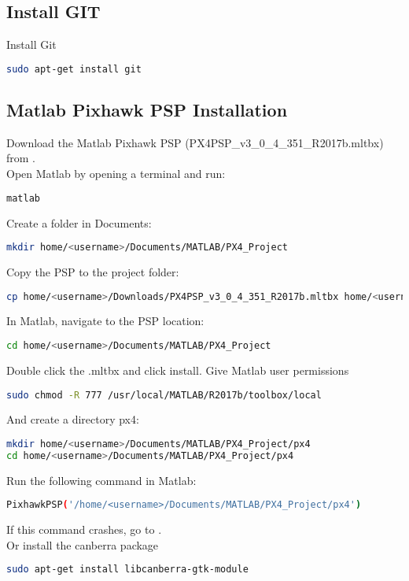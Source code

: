 \subsection{Install GIT}
Install Git
\begin{lstlisting}[language=sh]
sudo apt-get install git
\end{lstlisting}
\subsection{Matlab Pixhawk PSP Installation}
Download the Matlab Pixhawk PSP (PX4PSP\_v3\_0\_4\_351\_R2017b.mltbx) from \cite{Matlab_PSP}.\\
Open Matlab by opening a terminal and run:
\begin{lstlisting}[language=sh]
matlab
\end{lstlisting}
Create a folder in Documents:
\begin{lstlisting}[language=sh]
mkdir home/<username>/Documents/MATLAB/PX4_Project
\end{lstlisting}
Copy the PSP to the project folder:
\begin{lstlisting}[language=sh]
cp home/<username>/Downloads/PX4PSP_v3_0_4_351_R2017b.mltbx home/<username>/Documents/MATLAB/PX4_Project
\end{lstlisting}
In Matlab, navigate to the PSP location:
\begin{lstlisting}[language=sh]
cd home/<username>/Documents/MATLAB/PX4_Project
\end{lstlisting}
Double click the .mltbx and click install.
Give Matlab user permissions
\begin{lstlisting}[language=sh]
sudo chmod -R 777 /usr/local/MATLAB/R2017b/toolbox/local
\end{lstlisting}
And create a directory px4:
\begin{lstlisting}[language=sh]
mkdir home/<username>/Documents/MATLAB/PX4_Project/px4
cd home/<username>/Documents/MATLAB/PX4_Project/px4
\end{lstlisting}
Run the following command in Matlab:
\begin{lstlisting}[language=sh]
PixhawkPSP('/home/<username>/Documents/MATLAB/PX4_Project/px4')
\end{lstlisting}
If this command crashes, go to \cite{PSPLoadError}.\\
Or install the canberra package
\begin{lstlisting}[language=sh]
sudo apt-get install libcanberra-gtk-module
\end{lstlisting}
